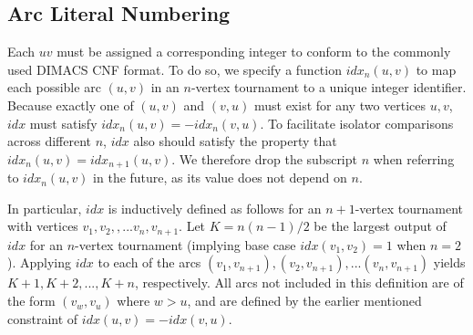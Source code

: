 \documentclass[conference]{IEEEtran}
\begin{document}
\subsection{Arc Literal Numbering}
Each $uv$ must be assigned a corresponding integer to conform to the commonly used DIMACS CNF format.
To do so, we specify a function $idx_n(u,v)$ to map each possible arc $(u,v)$ in an $n$-vertex tournament to a unique integer identifier.  Because exactly one of $(u,v)$ and $(v,u)$ must exist for any two vertices $u,v$, $\mathit{idx}$ must satisfy $\mathit{idx}_n(u,v) = -\mathit{idx}_n(v,u)$. To facilitate isolator comparisons across different $n$, $\mathit{idx}$ also should satisfy the property that $\mathit{idx}_n(u,v) = \mathit{idx}_{n+1}(u,v)$. We therefore drop the subscript $n$ when referring to $\mathit{idx}_n(u,v) $ in the future, as its value does not depend on $n$. 

In particular, $\mathit{idx}$ is inductively defined as follows for an $n+1$-vertex tournament with vertices $v_1, v_2,,...v_n, v_{n+1}$. Let $K = n(n-1)/2$ be the largest output of $\mathit{idx}$ for an $n$-vertex tournament (implying base case $\mathit{idx}(v_1,v_2) = 1$ when $n=2$). Applying $\mathit{idx}$ to each of the arcs $(v_1,v_{n+1}), (v_2,v_{n+1}), ... (v_n, v_{n+1})$ yields $K+1, K+2,...,K+n$, respectively. All arcs not included in this definition are of the form $(v_w, v_u)$ where $w>u$, and are defined by the earlier mentioned constraint of $\mathit{idx}(u,v) = -\mathit{idx}(v,u)$.






\end{document}
